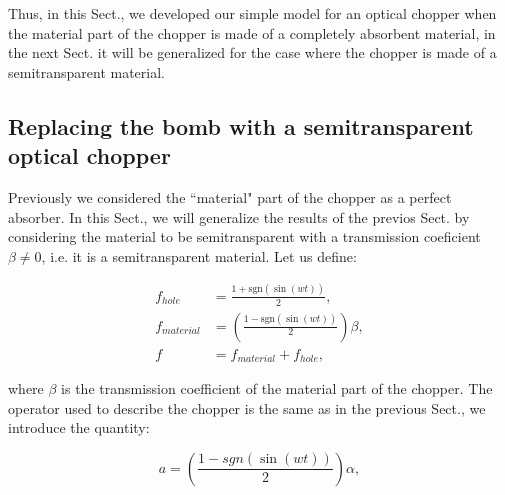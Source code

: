 \documentclass[12pt]{book}
\begin{document}
Thus, in this Sect., we developed our simple model for an optical chopper when the material part of the chopper is made of a completely absorbent material, in the next Sect. it will be generalized for the case where the chopper is made of a semitransparent material.

\subsection{Replacing the bomb with a semitransparent optical chopper }

Previously we considered the ``material" part of the chopper as a perfect absorber. In this Sect.,  we will generalize the results of the previos Sect. by considering the material to be semitransparent with a transmission coeficient $\beta \neq 0$, i.e. it is a semitransparent material. Let us define: 
 

\begin{align}
f_{hole}&=\frac{1+\mathrm{sgn}(\sin(wt))}{2},\label{beta111}\\
f_{material}&=\left(\frac{1-\mathrm{sgn}(\sin(wt))}{2} \right)\beta,\label{beta11}\\
f&=f_{material}+f_{hole}, \label{beta1}
\end{align}


where $\beta$ is the transmission coefficient of the material part of the chopper. The operator used to describe the chopper is the same as in the previous Sect., we introduce the quantity:


\begin{equation}
a=\left(\frac{1-sgn(\sin(wt))}{2}\right) \alpha,
\end{equation}
\end{document}
